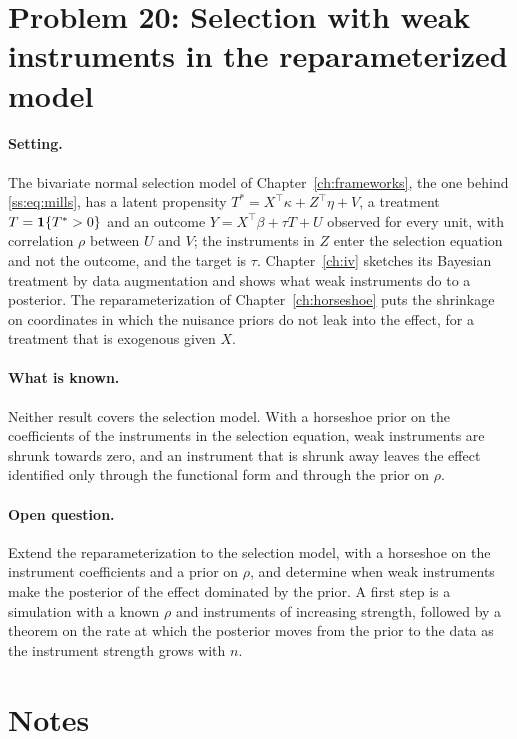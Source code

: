 \section{Problem 20: Selection with weak instruments in the reparameterized model}

\paragraph{Setting.} The bivariate normal selection model of Chapter~\ref{ch:frameworks}, the one behind \eqref{ss:eq:mills}, has a latent propensity $T^\ast=X^\top\kappa+Z^\top\eta+V$, a treatment $T=\mathbf{1}\{T^\ast>0\}$ and an outcome $Y=X^\top\beta+\tau T+U$ observed for every unit, with correlation $\rho$ between $U$ and $V$; the instruments in $Z$ enter the selection equation and not the outcome, and the target is $\tau$. Chapter~\ref{ch:iv} sketches its Bayesian treatment by data augmentation and shows what weak instruments do to a posterior. The reparameterization of Chapter~\ref{ch:horseshoe} puts the shrinkage on coordinates in which the nuisance priors do not leak into the effect, for a treatment that is exogenous given $X$.

\paragraph{What is known.} Neither result covers the selection model. With a horseshoe prior on the coefficients of the instruments in the selection equation, weak instruments are shrunk towards zero, and an instrument that is shrunk away leaves the effect identified only through the functional form and through the prior on $\rho$.

\paragraph{Open question.} Extend the reparameterization to the selection model, with a horseshoe on the instrument coefficients and a prior on $\rho$, and determine when weak instruments make the posterior of the effect dominated by the prior. A first step is a simulation with a known $\rho$ and instruments of increasing strength, followed by a theorem on the rate at which the posterior moves from the prior to the data as the instrument strength grows with $n$.

\section*{Notes}

